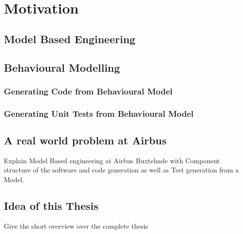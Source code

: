\chapter{Motivation}
\section{Model Based Engineering}
\section{Behavioural Modelling}
\subsection{Generating Code from Behavioural Model}
\subsection{Generating Unit Tests from Behavioural Model}
\section{A real world problem at Airbus}
Explain Model Based engineering at Airbus Buxtehude with Component structure of the software and code generation as well as Test generation from a Model.
\section{Idea of this Thesis}

Give the short overview over the complete thesis
